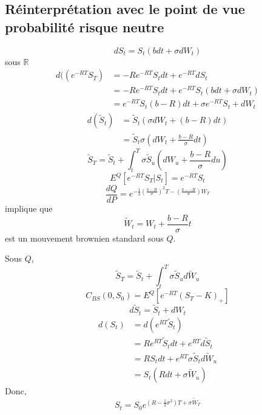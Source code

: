 \documentclass{article}
\theoremstyle{plain}
\theoremstyle{definition}
\begin{document}
\subsection{R\'einterpr\'etation avec le point de vue probabilit\'e risque neutre}

\begin{equation}
dS_t=S_t(bdt+\sigma dW_t)
\end{equation}
sous $\mathbb{R}$
\begin{equation}
\begin{split}
d((e^{-RT}S_T)&=-Re^{-RT}S_tdt+e^{-RT}dS_t\\
&=-Re^{-RT}S_tdt+e^{-RT}S_t(bdt+\sigma dW_t)\\
&=e^{-RT}S_t(b-R)dt+\sigma e^{-RT}S_t+d W_t
\end{split}
\end{equation}
\begin{equation}
\begin{split}
d(\tilde{S}_t)&=\tilde{S}_t(\sigma dW_t+(b-R)dt)\\
&=\tilde{S}_t\sigma (dW_t+\frac{b-R}{\sigma}dt)
\end{split}
\end{equation}
\begin{equation}
\tilde{S}_T=\tilde{S}_t+\int_t^T\sigma\tilde{S}_u(dW_u+\frac{b-R}{\sigma}du)
\end{equation}
\begin{equation}
E^Q[e^{-RT}S_T|S_t]=e^{-RT}S_t
\end{equation}
\begin{equation}
\frac{dQ}{dP}=e^{-\frac{1}{2}(\frac{b-R}{\sigma})^2T-(\frac{b--R}{\sigma})W_T}
\end{equation}
implique que 
\begin{equation}
\tilde{W}_t=W_t+\frac{b-R}{\sigma}t
\end{equation}
 est un mouvement brownien standard sous $Q$.
 
 Sous $Q$,
\begin{equation}
\tilde{S}_T=\tilde{S}_t+\int_t^T\sigma\tilde{S}_ud\tilde{W}_u
\end{equation}
\begin{equation}
C_{BS}(0,S_0)=E^Q[e^{-RT}(S_T-K)_+]
\end{equation}
\begin{equation}
d\tilde{S}_t=\tilde{S}_t+dW_t
\end{equation}
\begin{equation}
\begin{split}
d(S_t)&=d(e^{RT}\tilde{S}_t)\\
&=Re^{RT}\tilde{S}_tdt+e^{RT}d\tilde{S}_t\\
&=RS_tdt+e^{RT}\sigma\tilde{S}_td\tilde{W}_u\\
&=S_t(Rdt+\sigma\tilde{W}_u)
\end{split}
\end{equation}
Donc,
\begin{equation}
S_t=S_0e^{(R-\frac{1}{2}\sigma^2)T+\sigma\tilde{W}_T}
\end{equation}
\end{document}
